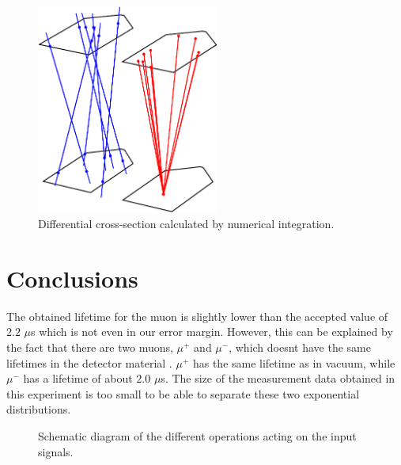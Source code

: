 \documentclass[10pt,twocolumn]{article}
\begin{document}
\begin{figure}
\centering
\includegraphics[width=6cm]{mc-crop.pdf}
\caption{Differential cross-section calculated by numerical integration.}
\label{cc}
\end{figure}

\section{Conclusions}
The obtained lifetime for the muon is slightly lower than the accepted value of $2.2$ $\mu$s which is not even in our error margin. However, this can be explained by the fact that there are two muons, $\mu^+$ and $\mu^-$, which doesnt have the same lifetimes in the detector material \cite{}. $\mu^+$ has the same lifetime as in vacuum, while $\mu^-$ has a lifetime of about $2.0$ $\mu$s. The size of the measurement data obtained in this experiment is too small to be able to separate these two exponential distributions.




\begin{figure}[h]

\caption{\label{setup} Schematic diagram of the different operations acting on the input signals.}
\end{figure}
\end{document}
